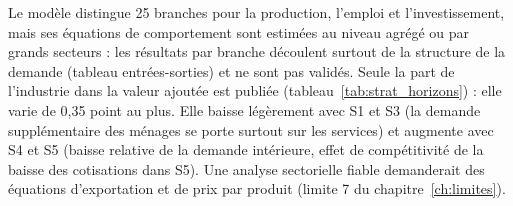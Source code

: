 Le modèle distingue 25 branches pour la production, l'emploi et l'investissement, mais ses équations de comportement
sont estimées au niveau agrégé ou par grands secteurs : les résultats par branche découlent surtout de la structure de
la demande (tableau entrées-sorties) et ne sont pas validés. Seule la part de l'industrie dans la valeur ajoutée est
publiée (tableau~\ref{tab:strat_horizons}) : elle varie de 0,35 point au plus. Elle baisse légèrement avec S1 et S3
(la demande supplémentaire des ménages se porte surtout sur les services) et augmente avec S4 et S5 (baisse relative de
la demande intérieure, effet de compétitivité de la baisse des cotisations dans S5). Une analyse sectorielle fiable demanderait des équations
d'exportation et de prix par produit (limite 7 du chapitre~\ref{ch:limites}).

